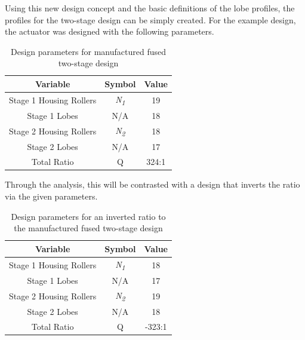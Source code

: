 Using this new design concept and the basic definitions of the lobe profiles, the profiles for the two-stage design can be simply created. For the example design, the actuator was designed with the following parameters. 
\begin{table}[h]
  \vskip0.2cm
  \caption{Design parameters for manufactured fused two-stage design}
  \label{table:two_stage_design_params}
  \begin{center}
    \vskip-0.2cm
	\begin{tabular}{|c|c|c|}
		\hline
		Variable & Symbol & Value\\
		\hline
		Stage 1 Housing Rollers & \textit{N\textsubscript{1}} & 19\\
		\hline
		Stage 1 Lobes & N/A & 18\\
		\hline
		Stage 2 Housing Rollers & \textit{N\textsubscript{2}} & 18\\
		\hline
		Stage 2 Lobes & N/A & 17\\
		\hline
		Total Ratio & Q & 324:1 \\
		\hline
	\end{tabular}
  \end{center}
\end{table}

Through the analysis, this will be contrasted with a design that inverts the ratio via the given parameters. 

\begin{table}[h]
  \vskip0.2cm
  \caption{Design parameters for an inverted ratio to the manufactured fused two-stage design}
  \label{table:two_stage_invert_design_params}
  \begin{center}
    \vskip-0.2cm
	\begin{tabular}{|c|c|c|}
		\hline
		Variable & Symbol & Value\\
		\hline
		Stage 1 Housing Rollers & \textit{N\textsubscript{1}} & 18\\
		\hline
		Stage 1 Lobes & N/A & 17\\
		\hline
		Stage 2 Housing Rollers & \textit{N\textsubscript{2}} & 19\\
		\hline
		Stage 2 Lobes & N/A & 18\\
		\hline
		Total Ratio & Q & -323:1 \\
		\hline
	\end{tabular}
  \end{center}
\end{table}



